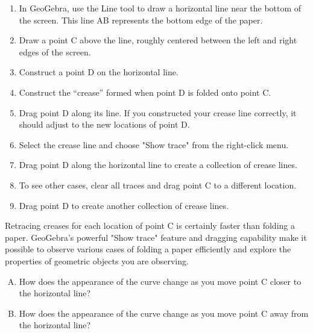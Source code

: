 \documentclass[11pt]{article}
\begin{document}
\begin{enumerate}[(1)]
\item In GeoGebra, use the Line tool to draw a horizontal line near the bottom of the screen. This line AB represents the bottom edge of the paper.
\item Draw a point C above the line, roughly centered between the left and right edges of the screen.	 	
\item Construct a point D on the horizontal line.
\item Construct the “crease” formed when point D is folded onto point C.
\item Drag point D along its line. If you constructed your crease line correctly, it should adjust to the new locations of point D.
\item Select the crease line and choose "Show trace" from the right-click menu.
\item Drag point D along the horizontal line to create a collection of crease lines.
\item To see other cases, clear all traces and drag point C to a different location.
\item Drag point D to create another collection of crease lines.
\end{enumerate}

\smallskip

\noindent Retracing creases for each location of point C is certainly faster than folding a paper. GeoGebra’s powerful "Show trace" feature and dragging capability make it possible to observe various cases of folding a paper efficiently and explore the properties of geometric objects you are observing.




\vspace{0.2 in}


\begin{enumerate}[(A)]
\item How does the appearance of the curve change as you move point C closer to the horizontal line?

\item How does the appearance of the curve change as you move point C away from the horizontal line?


\end{enumerate}

\vspace{0.2 in}

\end{document}
